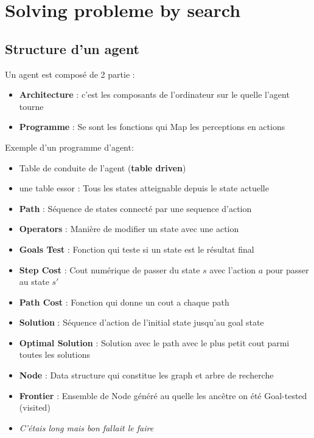\section{ Solving probleme by search}
\subsection{Structure d'un agent}
	Un agent est composé de 2 partie :
	\begin{itemize}
		\item \textbf{Architecture} : c'est les composants de l'ordinateur sur le quelle l'agent tourne
		\item \textbf{Programme} : Se sont les fonctions qui Map les perceptions en actions
	\end{itemize}
	
	Exemple d'un programme d'agent:
	
	\begin{itemize}
		\item Table de conduite de l'agent (\textbf{table driven})\\
		\item une table essor : Tous les states atteignable depuis le state actuelle\\
		\item \textbf{Path} : Séquence de states connecté par une sequence d'action\\
		\item \textbf{Operators} : Manière de modifier un state avec une action\\
		\item \textbf{Goals Test} : Fonction qui teste si un state est le résultat final\\
		\item \textbf{Step Cost} : Cout numérique de passer du state $s$ avec l'action $a$ pour passer au state $s'$\\
		\item \textbf{Path Cost} : Fonction qui donne un cout a chaque path\\
		\item \textbf{Solution} : Séquence d'action de l'initial state jusqu'au goal state\\
		\item \textbf{Optimal Solution} : Solution avec le path avec le plus petit cout parmi toutes les solutions\\
		\item \textbf{Node} : Data structure qui constitue les graph et arbre de recherche\\
		\item \textbf{Frontier} : Ensemble de Node généré au quelle les ancêtre on été Goal-tested (visited)\\
		
		\item \textit{C'étais long mais bon fallait le faire}
		
	\end{itemize}
